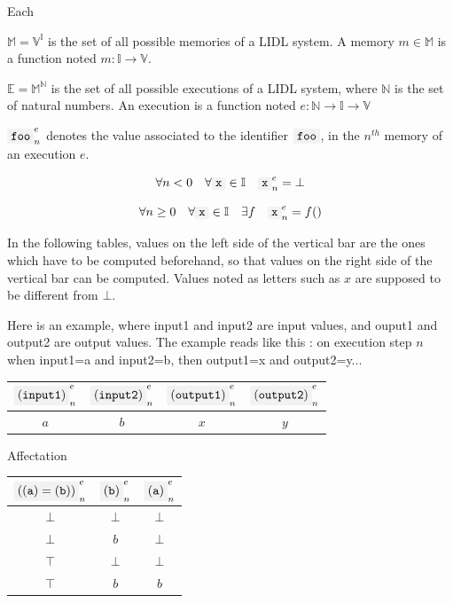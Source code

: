 \noindent
Each 



\begin{definition}[Memory]
$\mathbb{M} = \mathbb{V}^\mathbb{I}$ is the set of all possible memories of a LIDL system. A memory $m \in \mathbb{M}$ is a function noted $m:\mathbb{I}\rightarrow\mathbb{V}$.
\end{definition}


\begin{definition}[Execution]
$\mathbb{E} = \mathbb{M}^\mathbb{N}$ is the set of all possible executions of a LIDL system, where $\mathbb{N}$ is the set of natural numbers. An execution is a function noted $e:\mathbb{N}\rightarrow\mathbb{I}\rightarrow\mathbb{V}$
\end{definition}

\begin{definition}[Valuation]
$\codemath{foo}_n^e$ denotes the value associated to the identifier $\codemath{foo}$, in the $n^{th}$ memory of an execution $e$. 
\end{definition}


\[\forall n < 0 \quad \forall \codemath{x} \in \mathbb{I} \quad \codemath{x}_n^e = \bot\]

\[\forall n \geq 0 \quad \forall \codemath{x} \in \mathbb{I} \quad \exists f \quad \codemath{x}_n^e = f()\]

In the following tables, values on the left side of the vertical bar are the ones which have to be computed beforehand, so that values on the right side of the vertical bar can be computed. Values noted as letters such as $x$ are supposed to be different from $\bot$.

Here is an example, where input1 and input2 are input values, and ouput1 and output2 are output values. The example reads like this : on execution step $n$ when input1=a and input2=b, then output1=x and output2=y...

\begin{center}
\begin{tabular}{cc|cc}
  $\codemath{(input1)}_n^e$ & $\codemath{(input2)}_n^e$ & $\codemath{(output1)}_n^e$ & $\codemath{(output2)}_n^e$ \\
  \hline
  $a$&$b$&$x$&$y$ 
\end{tabular}
\end{center}




Affectation


\begin{center}
\begin{tabular}{cc|c}
  $\codemath{((a)=(b))}_n^e$ & $\codemath{(b)}_n^e$ & $\codemath{(a)}_n^e$ \\
  \hline
  $\bot$&$\bot$ &$\bot$ \\
  $\bot$& $b$&$\bot$ \\
  $\top$& $\bot$&$\bot$ \\
  $\top$& $b$&$b$ \\
\end{tabular}
\end{center}



